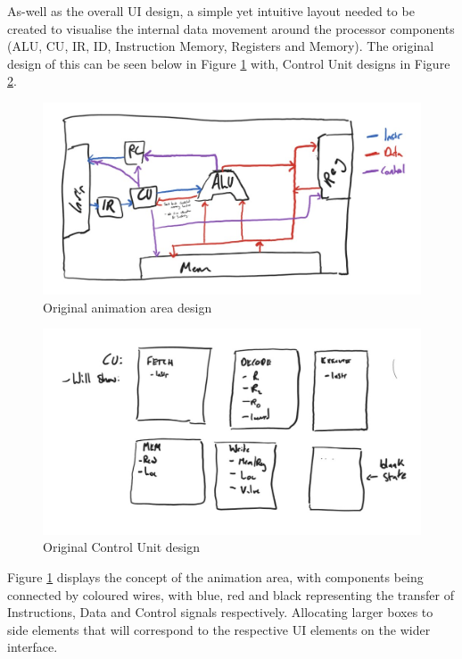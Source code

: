 As-well as the overall \ac{UI} design, a simple yet intuitive layout needed to be created to visualise the internal data movement around the processor components (\ac{ALU}, \ac{CU}, \ac{IR}, \ac{ID}, Instruction Memory, Registers and Memory). The original design of this can be seen below in Figure \ref{fig:early_animation_design} with, Control Unit designs in Figure \ref{fig:early_cu_design}.

\begin{figure}[H]
    \centering
    \includegraphics[width=\linewidth]{dissertation/DATA/animation_layout.jpg}
    \caption{Original animation area design}
    \label{fig:early_animation_design}
\end{figure}

\begin{figure}[H]
    \centering
    \includegraphics[width=\linewidth]{dissertation/DATA/control_unit.jpg}
    \caption{Original Control Unit design}
    \label{fig:early_cu_design}
\end{figure}

Figure \ref{fig:early_animation_design} displays the concept of the animation area, with components being connected by coloured wires, with blue, red and black representing the transfer of Instructions, Data and Control signals respectively. Allocating larger boxes to side elements that will correspond to the respective \ac{UI} elements on the wider interface.

